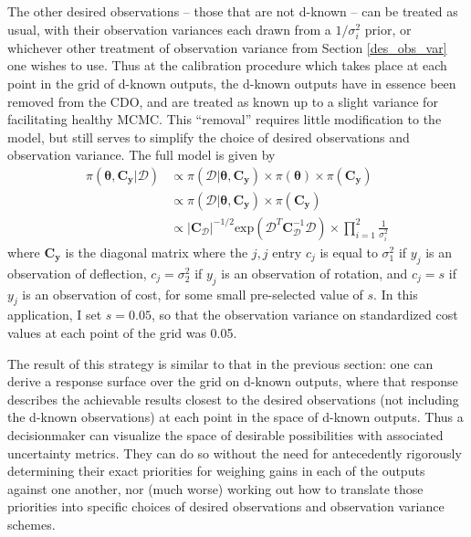 \documentclass{article}
\begin{document}
The other desired observations -- those that are not d-known -- can be treated as usual, with their observation variances each drawn from a $1/\sigma^2_i$ prior, or whichever other treatment of observation variance from Section \ref{des_obs_var} one wishes to use. Thus at the calibration procedure which takes place at each point in the grid of d-known outputs, the d-known outputs have in essence been removed from the CDO, and are treated as known up to a slight variance for facilitating healthy MCMC. This ``removal'' requires little modification to the model, but still serves to simplify the choice of desired observations and observation variance. The full model is given by
\begin{equation}\label{full_model_3}
\begin{aligned}
\pi(\boldsymbol\theta,\mathbf C_{\mathbf y}|\mathcal D ) &\propto
\pi(\mathcal D|\boldsymbol\theta,\mathbf C_{\mathbf y}) \times \pi(\boldsymbol\theta) \times \pi(\mathbf C_{\mathbf y})\\
&\propto  \pi(\mathcal D|\boldsymbol\theta,\mathbf C_{\mathbf y}) \times \pi(\mathbf C_{\mathbf y})\\
&\propto \lvert \mathbf C_{\mathcal D} \rvert ^{-1/2} \mathrm{exp}(\mathcal D^T \mathbf C_{\mathcal D}^{-1} \mathcal D) \times \prod_{i=1}^2 \frac1{\sigma^2_i}
\end{aligned}
\end{equation}
where $\mathbf C_{\mathbf y}$ is the diagonal matrix where the $j,j$ entry $c_j$ is equal to $\sigma^2_1$ if $y_j$ is an observation of deflection, $c_j=\sigma^2_2$ if $y_j$ is an observation of rotation, and $c_j = s$ if $y_j$ is an observation of cost, for some small pre-selected value of $s$. In this application, I set $s=0.05$, so that the observation variance on standardized cost values at each point of the grid was 0.05. 

The result of this strategy is similar to that in the previous section: one can derive a response surface over the grid on d-known outputs, where that response describes the achievable results closest to the desired observations (not including the d-known observations) at each point in the space of d-known outputs. Thus a decisionmaker can visualize the space of desirable possibilities with associated uncertainty metrics. They can do so without the need for antecedently rigorously determining their exact priorities for weighing gains in each of the outputs against one another, nor (much worse) working out how to translate those priorities into specific choices of desired observations and observation variance schemes. 
\end{document}
